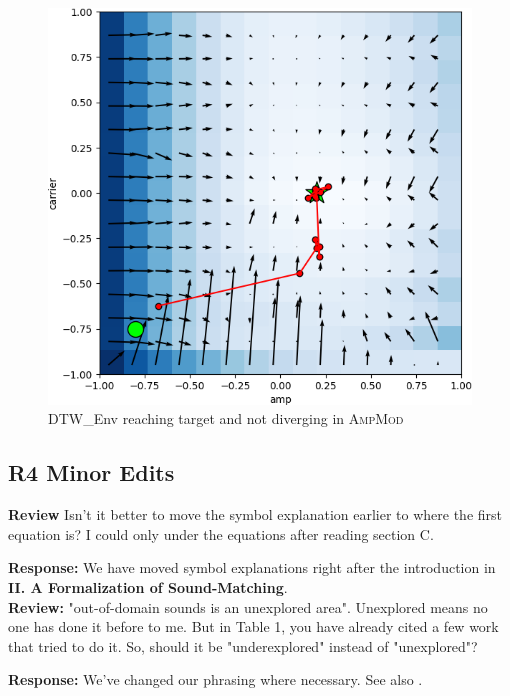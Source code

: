 \documentclass[11pt]{article}
\newcommand{\AmpMod}{\textsc{AmpMod}}
\begin{document}
\begin{figure}[h]
\begin{minipage}[t]{0.48\textwidth}
        \includegraphics[width=\linewidth]{images/experiment_plots/p2_DTW_Onset.png}
        \caption{DTW\_Env reaching target and not diverging in \AmpMod}
        \label{fig:p2_dtw_iterations}
    \end{minipage}
\end{figure}


\subsection{R4 Minor Edits}
\label{r4.minor}
\noindent\textbf{Review}
Isn't it better to move the symbol explanation earlier to where the first equation is? I could only under the equations after reading section C.

\noindent\textbf{Response:}
We have moved symbol explanations right after the introduction in 
\textbf{II. A Formalization of Sound-Matching}. 
\\

\noindent\textbf{Review:}
"out-of-domain sounds is an unexplored area". Unexplored means no one has done it before to me. But in Table 1, you have already cited a few work that tried to do it. So, should it be "underexplored" instead of "unexplored"?

\noindent\textbf{Response:}
We've changed our phrasing where necessary. See also .
\\
\end{document}
